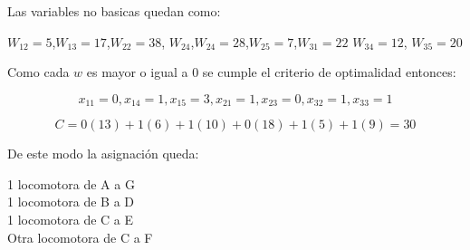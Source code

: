 \begin{itemize}
Las variables no basicas quedan como:

$W_{12}=5 $,$ W_{13}=17$,$W_{22}=38$, $W_{24}$,$W_{24}=28$,$W_{25}=7$,$W_{31}=22$
$W_{34}=12$, $W_{35}=20$

Como cada $w$ es mayor o igual a 0 se cumple el criterio de optimalidad entonces:

$$x_{11}=0,x_{14}=1,x_{15}=3,x_{21}=1,x_{23}=0,x_{32}=1,x_{33}=1$$

$$C=0(13)+1(6)+1(10)+0(18)+1(5)+1(9)=30$$

De este modo la asignaci\'on queda:

1 locomotora de A a G\\
1 locomotora de B a D\\
1 locomotora de C a E\\
Otra locomotora de C a F

\end{itemize}